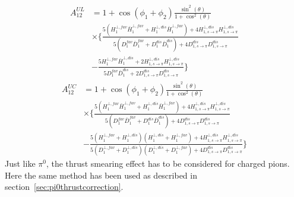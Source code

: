 \begin{equation}
\begin{aligned}
A^{UL}_{12}&=1+\cos(\phi_1+\phi_2)\frac{\sin^2(\theta)}{1+\cos^2(\theta)}\\
&\times\bigg\{\frac{5(H^{\bot,fav}_1\bar{H}^{\bot,fav}_1+H^{\bot,dis}_1\bar{H}^{\bot,fav}_1)+4H^{\bot,dis}_{1,s\rightarrow\pi}H^{\bot,dis}_{1,s\rightarrow\pi}}{5(D^{fav}_1\bar{D}^{fav}_1+D^{dis}_1\bar{D}^{dis}_1)+4D^{dis}_{1,s\rightarrow\pi}D^{dis}_{1,s\rightarrow\pi}}\\
&-\frac{5H^{\bot,fav}_1\bar{H}^{\bot,dis}_1+2H^{\bot,dis}_{1,s\rightarrow\pi}H^{\bot,dis}_{1,s\rightarrow\pi}}{5D^{fav}_1\bar{D}^{dis}_1 +2D^{dis}_{1,s\rightarrow\pi}D^{dis}_{1,s\rightarrow\pi}} \bigg\} 
\end{aligned}
\label{eqn:allratiosexpress2}
\end{equation}
\begin{equation}
\begin{aligned}
A^{UC}_{12}&=1+\cos(\phi_1+\phi_2)\frac{\sin^2(\theta)}{1+\cos^2(\theta)}\\
&\times\bigg\{\frac{5(H^{\bot,fav}_1\bar{H}^{\bot,fav}_1+H^{\bot,dis}_1\bar{H}^{\bot,fav}_1)+4H^{\bot,dis}_{1,s\rightarrow\pi}H^{\bot,dis}_{1,s\rightarrow\pi}}{5(D^{fav}_1\bar{D}^{fav}_1+D^{dis}_1\bar{D}^{dis}_1)+4D^{dis}_{1,s\rightarrow\pi}D^{dis}_{1,s\rightarrow\pi}}\\
&-\frac{5(H^{\bot,fav}_1+H^{\bot,dis}_1)(H^{\bot,dis}_1+H^{\bot,fav}_1)+4H^{\bot,dis}_{1,s\rightarrow\pi}H^{\bot,dis}_{1,s\rightarrow\pi}}{5(D^{\bot,fav}_1+D^{\bot,dis}_1)(D^{\bot,dis}_1+D^{\bot,fav}_1)+4D^{dis}_{1,s\rightarrow\pi}D^{dis}_{1,s\rightarrow\pi}} \bigg\}
\end{aligned}
\label{eqn:allratiosexpress3}
\end{equation}
Just like $\pi^0$, the thrust smearing effect has to be considered for charged pions. Here the same method has been used as described in section~\ref{sec:pi0thrustcorrection}. 
\iffalse
